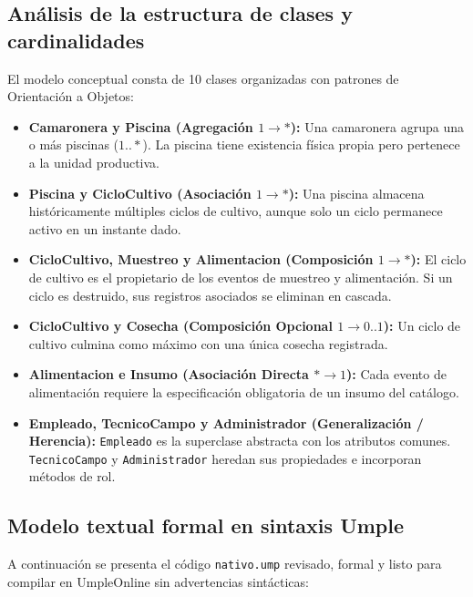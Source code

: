 \documentclass[11pt,a4paper]{article}
\begin{document}
\subsection{An\'alisis de la estructura de clases y cardinalidades}
El modelo conceptual consta de 10 clases organizadas con patrones de Orientaci\'on a Objetos:
\begin{itemize}
    \item \textbf{Camaronera y Piscina (Agregaci\'on $1 \to *$):} Una camaronera agrupa una o m\'as piscinas ($1..*$). La piscina tiene existencia f\'isica propia pero pertenece a la unidad productiva.
    \item \textbf{Piscina y CicloCultivo (Asociaci\'on $1 \to *$):} Una piscina almacena hist\'oricamente m\'ultiples ciclos de cultivo, aunque solo un ciclo permanece activo en un instante dado.
    \item \textbf{CicloCultivo, Muestreo y Alimentacion (Composici\'on $1 \to *$):} El ciclo de cultivo es el propietario de los eventos de muestreo y alimentaci\'on. Si un ciclo es destruido, sus registros asociados se eliminan en cascada.
    \item \textbf{CicloCultivo y Cosecha (Composici\'on Opcional $1 \to 0..1$):} Un ciclo de cultivo culmina como m\'aximo con una \'unica cosecha registrada.
    \item \textbf{Alimentacion e Insumo (Asociaci\'on Directa $* \to 1$):} Cada evento de alimentaci\'on requiere la especificaci\'on obligatoria de un insumo del cat\'alogo.
    \item \textbf{Empleado, TecnicoCampo y Administrador (Generalizaci\'on / Herencia):} \texttt{Empleado} es la superclase abstracta con los atributos comunes. \texttt{TecnicoCampo} y \texttt{Administrador} heredan sus propiedades e incorporan m\'etodos de rol.
\end{itemize}

\subsection{Modelo textual formal en sintaxis Umple}
A continuaci\'on se presenta el c\'odigo \texttt{nativo.ump} revisado, formal y listo para compilar en UmpleOnline sin advertencias sint\'acticas:
\end{document}
